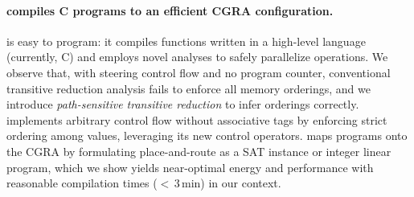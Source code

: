 \paragraph{\riptide compiles C programs to an efficient CGRA configuration.}
\riptide is easy to program: it compiles functions written in a high-level
language (currently, C) and employs novel analyses to safely
parallelize operations.
%
We observe that, with steering control flow and no program counter,
conventional transitive reduction analysis fails to enforce all memory
orderings, and we introduce \emph{path-sensitive transitive reduction}
to infer orderings correctly.
%
\riptide implements arbitrary control flow without associative tags by
enforcing strict ordering among values, leveraging its new control
operators.
%
%
\riptide maps programs onto the CGRA by formulating place-and-route as a
SAT instance or integer linear program,
which we show yields near-optimal energy and performance
with reasonable compilation times ($<$\,3\,min) in our context.

  
  
  
  
